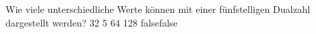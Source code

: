     {Wie viele unterschiedliche Werte können mit einer fünfstelligen Dualzahl dargestellt werden?}
    {32}
    {5}
    {64}
    {128}
    {false}{false}